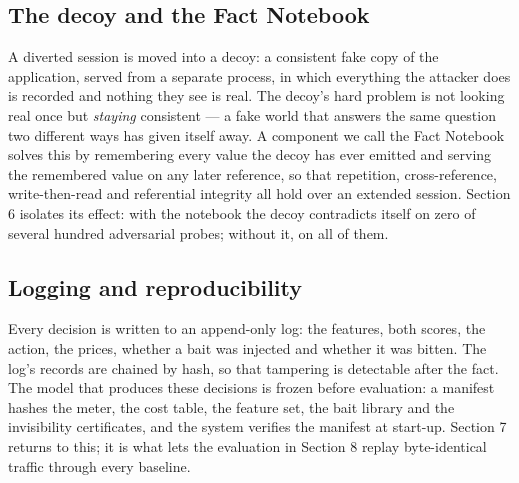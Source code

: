 \subsection{The decoy and the Fact Notebook}

A diverted session is moved into a decoy: a consistent fake copy of the
application, served from a separate process, in which everything the attacker does
is recorded and nothing they see is real. The decoy's hard problem is not looking
real once but \emph{staying} consistent --- a fake world that answers the same question
two different ways has given itself away. A component we call the Fact Notebook
solves this by remembering every value the decoy has ever emitted and serving the
remembered value on any later reference, so that repetition, cross-reference,
write-then-read and referential integrity all hold over an extended session.
Section 6 isolates its effect: with the notebook the decoy contradicts itself on
zero of several hundred adversarial probes; without it, on all of them.


\subsection{Logging and reproducibility}

Every decision is written to an append-only log: the features, both scores, the
action, the prices, whether a bait was injected and whether it was bitten. The log's
records are chained by hash, so that tampering is detectable after the fact. The
model that produces these decisions is frozen before evaluation: a manifest hashes
the meter, the cost table, the feature set, the bait library and the invisibility
certificates, and the system verifies the manifest at start-up. Section 7 returns
to this; it is what lets the evaluation in Section 8 replay byte-identical traffic
through every baseline.
